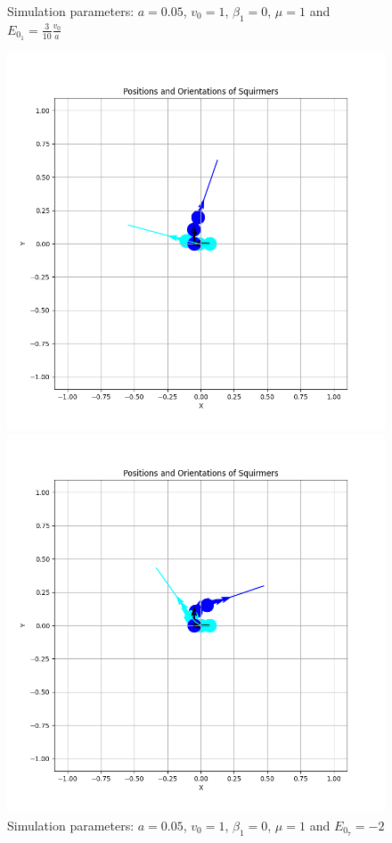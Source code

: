 \documentclass{article}
\begin{document}
\begin{figure}[H]
\begin{minipage}{0.49\textwidth}
        \caption{\footnotesize Simulation parameters: $a=0.05$, $v_0=1$, $\beta_1=0$, $\mu=1$ and $E_{0_{1}}=\frac{3}{10}\frac{v_0}{a}$}
    \end{minipage}
    \begin{minipage}{0.49\textwidth}
        \includegraphics[width=1\textwidth]{graphs/Eo_analysis/beta0/pi_/pi_m2.png}
        \caption{\footnotesize Simulation parameters: $a=0.05$, $v_0=1$, $\beta_1=0$, $\mu=1$ and $E_{0_{7}}=-2$}
    \end{minipage}\hfill
    \begin{minipage}{0.49\textwidth}
        \includegraphics[width=1\textwidth]{graphs/Eo_analysis/beta0/pi_/pi_m5.png}

\end{minipage}
\end{figure}
\end{document}
